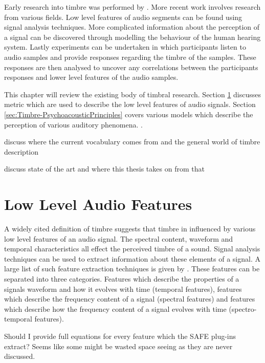 	Early research into timbre was performed by \citet{helmholtz1875on}. More recent work involves research from various
	fields. Low level features of audio segments can be found using signal analysis techniques. More complicated
	information about the perception of a signal can be discovered through modelling the behaviour of the human hearing
	system. Lastly experiments can be undertaken in which participants listen to audio samples and provide responses
	regarding the timbre of the samples. These responses are then analysed to uncover any correlations between the
	participants responses and lower level features of the audio samples.

	This chapter will review the existing body of timbral research. Section \ref{sec:Timbre-LowLevelFeatures} discusses
	metric which are used to describe the low level features of audio signals. Section
	\ref{sec:Timbre-PsychoacousticPrinciples} covers various models which describe the perception of various auditory
	phenomena. .

	\note
	{
		discuss where the current vocabulary comes from and the general world of timbre description

		discuss state of the art and where this thesis takes on from that
	}

\section{Low Level Audio Features}
\label{sec:Timbre-LowLevelFeatures}
	A widely cited definition of timbre \citep{ASA1960american} suggests that timbre in influenced by various low level
	features of an audio signal. The spectral content, waveform and temporal characteristics all effect the perceived
	timbre of a sound. Signal analysis techniques can be used to extract information about these elements of a signal.
	A large list of such feature extraction techniques is given by \citep{peeters2004a}. These features can be
	separated into three categories. Features which describe the properties of a signals waveform and how it evolves
	with time (temporal features), features which describe the frequency content of a signal (spectral features) and
	features which describe how the frequency content of a signal evolves with time (spectro-temporal features). 

	\note
	{
		Should I provide full equations for every feature which the SAFE plug-ins extract? Seems like some might be
		wasted space seeing as they are never discussed.
	}


